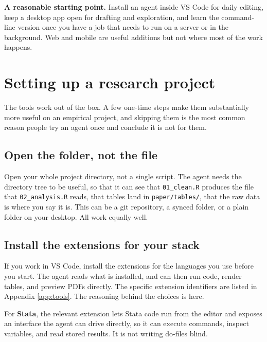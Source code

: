 \documentclass[11pt,a4paper]{article}
\newcommand{\code}[1]{\texttt{\small #1}}
\begin{document}
\begin{aside}
\textbf{A reasonable starting point.} Install an agent inside VS Code for daily
editing, keep a desktop app open for drafting and exploration, and learn the
command-line version once you have a job that needs to run on a server or in the
background. Web and mobile are useful additions but not where most of the work
happens.
\end{aside}

\section{Setting up a research project}
\label{sec:setup}

The tools work out of the box. A few one-time steps make them substantially more
useful on an empirical project, and skipping them is the most common reason
people try an agent once and conclude it is not for them.

\subsection{Open the folder, not the file}

Open your whole project directory, not a single script. The agent needs the
directory tree to be useful, so that it can see that \code{01\_clean.R} produces the file
that \code{02\_analysis.R} reads, that tables land in \code{paper/tables/}, that
the raw data is where you say it is. This can be a git repository, a synced
folder, or a plain folder on your desktop. All work equally well.

\subsection{Install the extensions for your stack}

If you work in VS Code, install the extensions for the languages you use before
you start. The agent reads what is installed, and can then run code, render
tables, and preview PDFs directly. The specific extension identifiers are listed
in Appendix \ref{app:tools}. The reasoning behind the choices is here.

For \textbf{Stata}, the relevant extension lets Stata code run from the editor
and exposes an interface the agent can drive directly, so it can execute
commands, inspect variables, and read stored results. It is not writing do-files
blind.
\end{document}
